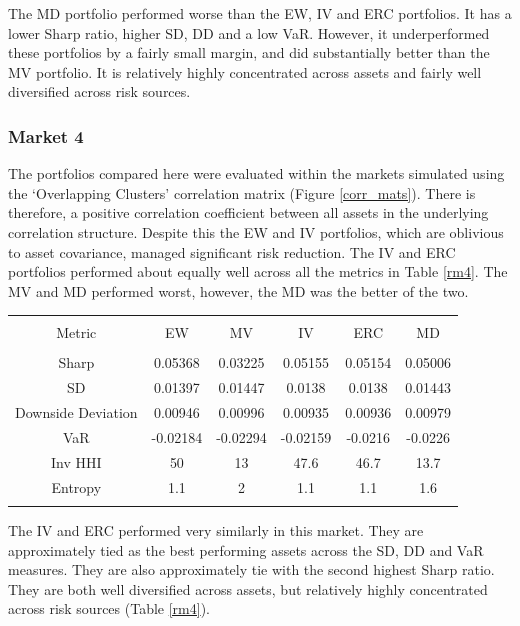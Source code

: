 \documentclass[11pt,preprint, authoryear]{elsarticle}
\let\origtable\table
\let\endorigtable\endtable
\renewenvironment{table}[1][2] {
    \expandafter\origtable\expandafter[H]
} {
    \endorigtable
}
\numberwithin{equation}{section}
\numberwithin{figure}{section}
\numberwithin{table}{section}
\begin{document}
The MD portfolio performed worse than the EW, IV and ERC portfolios. It
has a lower Sharp ratio, higher SD, DD and a low VaR. However, it
underperformed these portfolios by a fairly small margin, and did
substantially better than the MV portfolio. It is relatively highly
concentrated across assets and fairly well diversified across risk
sources.

\hypertarget{market-4}{%
\subsubsection{Market 4}\label{market-4}}

The portfolios compared here were evaluated within the markets simulated
using the `Overlapping Clusters' correlation matrix (Figure
\ref{corr_mats}). There is therefore, a positive correlation coefficient
between all assets in the underlying correlation structure. Despite this
the EW and IV portfolios, which are oblivious to asset covariance,
managed significant risk reduction. The IV and ERC portfolios performed
about equally well across all the metrics in Table \ref{rm4}. The MV and
MD performed worst, however, the MD was the better of the two.

\begin{table}[!htbp] \centering 
  \caption{Market 4 - Portfolio Risk Metrics} 
  \label{rm4} 
\begin{tabular}{@{\extracolsep{5pt}} cccccc} 
\\[-1.8ex]\hline 
\hline \\[-1.8ex] 
Metric & EW & MV & IV & ERC & MD \\ 
\hline \\[-1.8ex] 
Sharp & 0.05368 & 0.03225 & 0.05155 & 0.05154 & 0.05006 \\ 
SD & 0.01397 & 0.01447 & 0.0138 & 0.0138 & 0.01443 \\ 
Downside Deviation & 0.00946 & 0.00996 & 0.00935 & 0.00936 & 0.00979 \\ 
VaR & -0.02184 & -0.02294 & -0.02159 & -0.0216 & -0.0226 \\ 
Inv HHI & 50 & 13 & 47.6 & 46.7 & 13.7 \\ 
Entropy & 1.1 & 2 & 1.1 & 1.1 & 1.6 \\ 
\hline \\[-1.8ex] 
\end{tabular} 
\end{table}

The IV and ERC performed very similarly in this market. They are
approximately tied as the best performing assets across the SD, DD and
VaR measures. They are also approximately tie with the second highest
Sharp ratio. They are both well diversified across assets, but
relatively highly concentrated across risk sources (Table \ref{rm4}).
\end{document}
